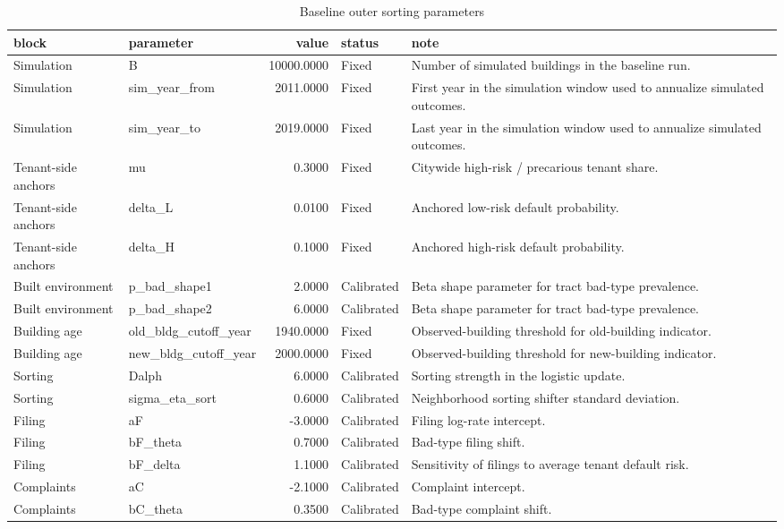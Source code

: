 \documentclass[
  11pt,
]{article}
\begin{document}
\begin{table}
\tiny

\caption{Baseline outer sorting parameters}
\centering
\begin{tabular}[t]{llrll}
\toprule
block & parameter & value & status & note\\
\midrule
Simulation & B & 10000.0000 & Fixed & Number of simulated buildings in the baseline run.\\
Simulation & sim\_year\_from & 2011.0000 & Fixed & First year in the simulation window used to annualize simulated outcomes.\\
Simulation & sim\_year\_to & 2019.0000 & Fixed & Last year in the simulation window used to annualize simulated outcomes.\\
Tenant-side anchors & mu & 0.3000 & Fixed & Citywide high-risk / precarious tenant share.\\
Tenant-side anchors & delta\_L & 0.0100 & Fixed & Anchored low-risk default probability.\\
Tenant-side anchors & delta\_H & 0.1000 & Fixed & Anchored high-risk default probability.\\
Built environment & p\_bad\_shape1 & 2.0000 & Calibrated & Beta shape parameter for tract bad-type prevalence.\\
Built environment & p\_bad\_shape2 & 6.0000 & Calibrated & Beta shape parameter for tract bad-type prevalence.\\
Building age & old\_bldg\_cutoff\_year & 1940.0000 & Fixed & Observed-building threshold for old-building indicator.\\
Building age & new\_bldg\_cutoff\_year & 2000.0000 & Fixed & Observed-building threshold for new-building indicator.\\
Sorting & Dalph & 6.0000 & Calibrated & Sorting strength in the logistic update.\\
Sorting & sigma\_eta\_sort & 0.6000 & Calibrated & Neighborhood sorting shifter standard deviation.\\
Filing & aF & -3.0000 & Calibrated & Filing log-rate intercept.\\
Filing & bF\_theta & 0.7000 & Calibrated & Bad-type filing shift.\\
Filing & bF\_delta & 1.1000 & Calibrated & Sensitivity of filings to average tenant default risk.\\
Complaints & aC & -2.1000 & Calibrated & Complaint intercept.\\
Complaints & bC\_theta & 0.3500 & Calibrated & Bad-type complaint shift.\\

\end{tabular}
\end{table}
\end{document}
